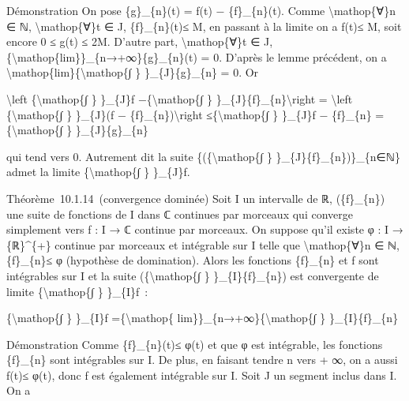 \documentclass[]{article}
\begin{document}
Démonstration On pose \{g\}\_\{n\}(t) = \textbar{}f(t) −
\{f\}\_\{n\}(t)\textbar{}. Comme \textbackslash{}mathop\{∀\}n ∈ ℕ,
\textbackslash{}mathop\{∀\}t ∈ J, \textbar{}\{f\}\_\{n\}(t)\textbar{}≤
M, en passant à la limite on a \textbar{}f(t)\textbar{}≤ M, soit encore
0 ≤ g(t) ≤ 2M. D'autre part, \textbackslash{}mathop\{∀\}t ∈ J,
\{\textbackslash{}mathop\{lim\}\}\_\{n→+∞\}\{g\}\_\{n\}(t) = 0. D'après
le lemme précédent, on a
\textbackslash{}mathop\{lim\}\{\textbackslash{}mathop\{∫ \}
\}\_\{J\}\{g\}\_\{n\} = 0. Or

\textbackslash{}left \textbar{}\{\textbackslash{}mathop\{∫ \} \}\_\{J\}f
−\{\textbackslash{}mathop\{∫ \}
\}\_\{J\}\{f\}\_\{n\}\textbackslash{}right \textbar{} =
\textbackslash{}left \textbar{}\{\textbackslash{}mathop\{∫ \}
\}\_\{J\}(f − \{f\}\_\{n\})\textbackslash{}right
\textbar{}≤\{\textbackslash{}mathop\{∫ \} \}\_\{J\}\textbar{}f −
\{f\}\_\{n\}\textbar{} =\{\textbackslash{}mathop\{∫ \}
\}\_\{J\}\{g\}\_\{n\}

qui tend vers 0. Autrement dit la suite \{(\{\textbackslash{}mathop\{∫
\} \}\_\{J\}\{f\}\_\{n\})\}\_\{n∈ℕ\} admet la limite
\{\textbackslash{}mathop\{∫ \} \}\_\{J\}f.

Théorème~10.1.14~(convergence dominée) Soit I un intervalle de ℝ,
(\{f\}\_\{n\}) une suite de fonctions de I dans ℂ continues par morceaux
qui converge simplement vers f : I → ℂ continue par morceaux. On suppose
qu'il existe φ : I → \{ℝ\}\^{}\{+\} continue par morceaux et intégrable
sur I telle que \textbackslash{}mathop\{∀\}n ∈ ℕ,
\textbar{}\{f\}\_\{n\}\textbar{}≤ φ (hypothèse de domination). Alors les
fonctions \{f\}\_\{n\} et f sont intégrables sur I et la suite
(\{\textbackslash{}mathop\{∫ \} \}\_\{I\}\{f\}\_\{n\}) est convergente
de limite \{\textbackslash{}mathop\{∫ \} \}\_\{I\}f~:

\{\textbackslash{}mathop\{∫ \} \}\_\{I\}f =\{\textbackslash{}mathop\{
lim\}\}\_\{n→+∞\}\{\textbackslash{}mathop\{∫ \} \}\_\{I\}\{f\}\_\{n\}

Démonstration Comme \textbar{}\{f\}\_\{n\}(t)\textbar{}≤ φ(t) et que φ
est intégrable, les fonctions \{f\}\_\{n\} sont intégrables sur I. De
plus, en faisant tendre n vers + ∞, on a aussi \textbar{}f(t)\textbar{}≤
φ(t), donc f est également intégrable sur I. Soit J un segment inclus
dans I. On a
\end{document}
